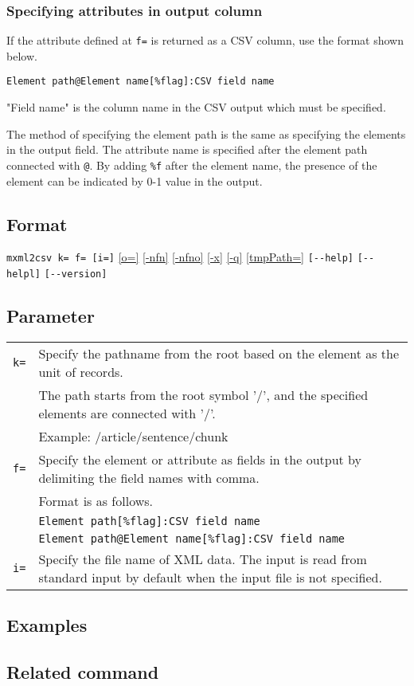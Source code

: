 \subsubsection*{Specifying attributes in output column}
If the attribute  defined at \verb|f=| is returned as a CSV column, use the format shown below.

\verb|Element path@Element name[%flag]:CSV field name|

"Field name" is the column name in the CSV output which must be specified.

The method of specifying the element path is the same as specifying the elements in the output field. The attribute name is specified after the element path connected with \verb|@|. By adding \verb|%f| after the element name, the presence of the element can be indicated by 0-1 value in the output.

\subsection*{Format}
\verb|mxml2csv k= f= [i=]|
\hyperref[sect:option_o]{[o=]}
\hyperref[sect:option_nfn]{[-nfn]} 
\hyperref[sect:option_nfno]{[-nfno]}  
\hyperref[sect:option_x]{[-x]}
\hyperref[sect:option_q]{[-q]}
\hyperref[sect:option_option_tmppath]{[tmpPath=]}
\verb|[--help]|
\verb|[--helpl]|
\verb|[--version]|\\

\subsection*{Parameter}
\begin{table}[htbp]
{\small
\begin{tabular}{ll}
\verb|k=|    & Specify the pathname from the root based on the element as the unit of records.\\
             & The path starts from the root symbol '/', and the specified elements are connected with '/'.\\
             & Example: /article/sentence/chunk \\
\verb|f=|    & Specify the element or attribute as fields in the output by delimiting the field names with comma.\\
             & Format is as follows. \\
             & \verb|Element path[%flag]:CSV field name|\\
             & \verb|Element path@Element name[%flag]:CSV field name|\\
\verb|i=|    & Specify the file name of XML data. The input is read from standard input by default when the input file is not specified.\\
\end{tabular} 
}
\end{table} 

\subsection*{Examples}

\subsection*{Related command}

%
